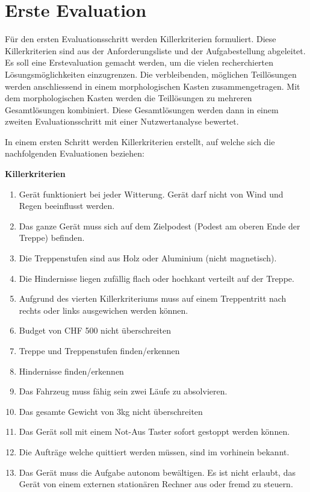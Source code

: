 \section{Erste Evaluation}

Für den ersten Evaluationsschritt werden Killerkriterien formuliert. Diese Killerkriterien sind aus der Anforderungsliste und der Aufgabestellung abgeleitet. Es soll eine Erstevaluation gemacht werden, um die vielen recherchierten Lösungsmöglichkeiten einzugrenzen. Die verbleibenden, möglichen Teillösungen werden anschliessend in einem morphologischen Kasten zusammengetragen. Mit dem morphologischen Kasten werden die Teillösungen zu mehreren Gesamtlösungen kombiniert. Diese Gesamtlösungen werden dann in einem zweiten Evaluationsschritt mit einer Nutzwertanalyse bewertet.

In einem ersten Schritt werden Killerkriterien erstellt, auf welche sich die nachfolgenden Evaluationen beziehen:

\textbf{Killerkriterien}
\begin{enumerate} 
	\item Gerät funktioniert bei jeder Witterung. Gerät darf nicht von Wind und Regen beeinflusst werden.
	\item Das ganze Gerät muss sich auf dem Zielpodest (Podest am oberen Ende der Treppe) befinden.
	\item Die Treppenstufen sind aus Holz oder Aluminium (nicht magnetisch).
	\item Die Hindernisse liegen zufällig flach oder hochkant verteilt auf der Treppe.
	\item Aufgrund des vierten Killerkriteriums muss auf einem Treppentritt nach rechts oder links ausgewichen werden können.
    \item Budget von CHF 500 nicht überschreiten
	\item Treppe und Treppenstufen finden/erkennen
	\item Hindernisse finden/erkennen
	\item Das Fahrzeug muss fähig sein zwei Läufe zu absolvieren.
	\item Das gesamte Gewicht von 3kg nicht überschreiten
	\item Das Gerät soll mit einem Not-Aus Taster sofort gestoppt werden können. 
	\item Die Aufträge welche quittiert werden müssen, sind im vorhinein bekannt.
	\item Das Gerät muss die Aufgabe autonom bewältigen. Es ist nicht erlaubt, das Gerät von einem externen stationären Rechner aus oder fremd zu steuern.
\end{enumerate}



